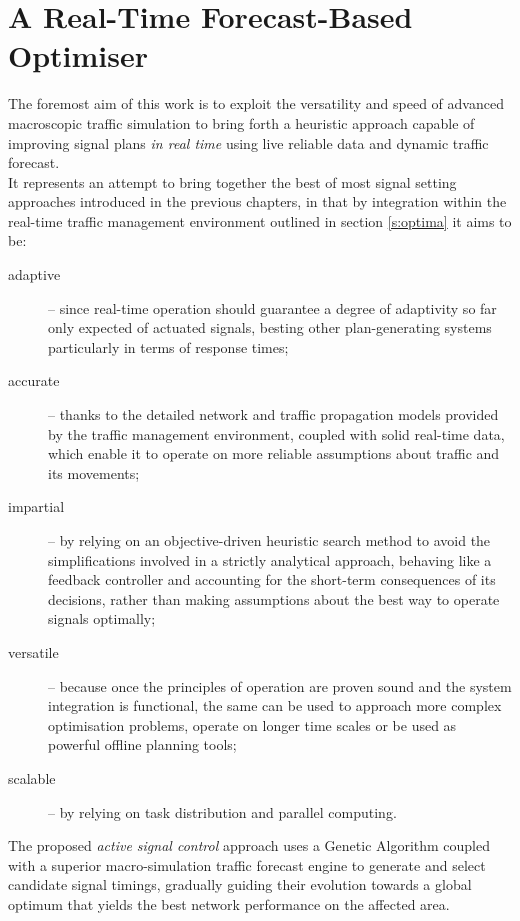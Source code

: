 \chapter{A Real-Time Forecast-Based Optimiser} \label{c:optimiser}

The foremost aim of this work is to exploit the versatility and speed of advanced macroscopic traffic simulation to bring forth a heuristic approach capable of improving signal plans \emph{in real time} using live reliable data and dynamic traffic forecast.\\
It represents an attempt to bring together the best of most signal setting approaches introduced in the previous chapters, in that by integration within the real-time traffic management environment outlined in section \ref{s:optima} it aims to be:
\begin{description}
\item[adaptive] \--- since real-time operation should guarantee a degree of adaptivity so far only expected of actuated signals, besting other plan-generating systems particularly in terms of response times;

\item[accurate] \--- thanks to the detailed network and traffic propagation models provided by the traffic management environment, coupled with solid real-time data, which enable it to operate on more reliable assumptions about traffic and its movements;

\item[impartial] \--- by relying on an objective-driven heuristic search method to avoid the simplifications involved in a strictly analytical approach, behaving like a feedback controller and accounting for the short-term consequences of its decisions, rather than making assumptions about the best way to operate signals optimally;

\item[versatile] \--- because once the principles of operation are proven sound and the system integration is functional, the same can be used to approach more complex optimisation problems, operate on longer time scales or be used as powerful offline planning tools;

\item[scalable] \--- by relying on task distribution and parallel computing.
\end{description}

The proposed \emph{active signal control} approach uses a Genetic Algorithm coupled with a superior macro-simulation traffic forecast engine to generate and select candidate signal timings, gradually guiding their evolution towards a global optimum that yields the best network performance on the affected area.

